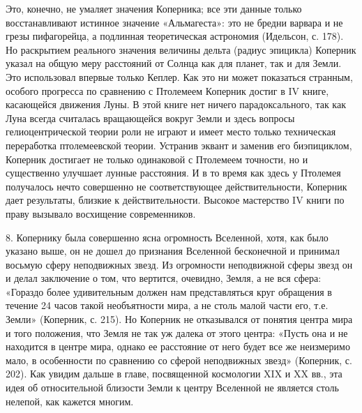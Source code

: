 Это, конечно, не умаляет значения Коперника; все эти данные только
восстанавливают истинное значение «Альмагеста»: это не бредни варвара
и не грезы пифагорейца, а подлинная теоретическая астрономия
(Идельсон, с. 178). Но раскрытием реального значения величины дельта
(радиус эпицикла) Коперник указал на общую меру расстояний от Солнца
как для планет, так и для Земли. Это использовал впервые только
Кеплер. Как это ни может показаться странным, особого прогресса по
сравнению с Птолемеем Коперник достиг в IV книге, касающейся движения
Луны. В этой книге нет ничего парадоксального, так как Луна всегда
считалась вращающейся вокруг Земли и здесь вопросы гелиоцентрической
теории роли не играют и имеет место только техническая переработка
птолемеевской теории. Устранив эквант и заменив его биэпициклом,
Коперник достигает не только одинаковой с Птолемеем точности, но и
существенно улучшает лунные расстояния. И в то время как здесь у
Птолемея получалось нечто совершенно не соответствующее
действительности, Коперник дает результаты, близкие к
действительности. Высокое мастерство IV книги по праву вызывало
восхищение современников.

8. Копернику была совершенно ясна огромность Вселенной, хотя, как было
указано выше, он не дошел до признания Вселенной бесконечной и
принимал восьмую сферу неподвижных звезд. Из огромности неподвижной
сферы звезд он и делал заключение о том, что вертится, очевидно,
Земля, а не вся сфера: «Гораздо более удивительным должен нам
представляться круг обращения в течение 24 часов такой необъятности
мира, а не столь малой части его, т.е. Земли» (Коперник, с. 215). Но
Коперник не отказывался от понятия центра мира и того положения, что
Земля не так уж далека от этого центра: «Пусть она и не находится в
центре мира, однако ее расстояние от него будет все же неизмеримо
мало, в особенности по сравнению со сферой неподвижных звезд»
(Коперник, с. 202). Как увидим дальше в главе, посвященной космологии
XIX и XX вв., эта идея об относительной близости Земли к центру
Вселенной не является столь нелепой, как кажется многим.

